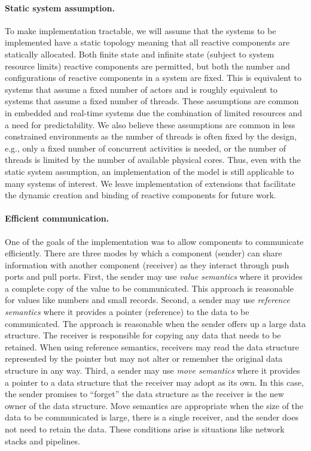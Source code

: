 \paragraph{Static system assumption.}
To make implementation tractable, we will assume that the systems to be implemented have a static topology meaning that all reactive components are statically allocated.
Both finite state and infinite state (subject to system resource limits) reactive components are permitted, but both the number and configurations of reactive components in a system are fixed.
This is equivalent to systems that assume a fixed number of actors and is roughly equivalent to systems that assume a fixed number of threads.
These assumptions are common in embedded and real-time systems due the combination of limited resources and a need for predictability.
We also believe these assumptions are common in less constrained environments as the number of threads is often fixed by the design, e.g., only a fixed number of concurrent activities is needed, or the number of threads is limited by the number of available physical cores.
Thus, even with the static system assumption, an implementation of the model is still applicable to many systems of interest.
We leave implementation of extensions that facilitate the dynamic creation and binding of reactive components for future work.

\paragraph{Efficient communication.}
One of the goals of the implementation was to allow components to communicate efficiently.
There are three modes by which a component (sender) can share information with another component (receiver) as they interact through push ports and pull ports.
First, the sender may use \emph{value semantics} where it provides a complete copy of the value to be communicated.
This approach is reasonable for values like numbers and small records.
Second, a sender may use \emph{reference semantics} where it provides a pointer (reference) to the data to be communicated.
The approach is reasonable when the sender offers up a large data structure.
The receiver is responsible for copying any data that needs to be retained.
When using reference semantics, receivers may read the data structure represented by the pointer but may not alter or remember the original data structure in any way.
Third, a sender may use \emph{move semantics} where it provides a pointer to a data structure that the receiver may adopt as its own.
In this case, the sender promises to ``forget'' the data structure as the receiver is the new owner of the data structure.
Move semantics are appropriate when the size of the data to be communicated is large, there is a single receiver, and the sender does not need to retain the data.
These conditions arise is situations like network stacks and pipelines.

